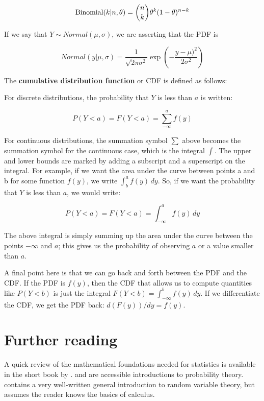 \documentclass[12pt,]{krantz}
\begin{document}
\begin{equation}
\hbox{Binomial}(k|n,\theta) = 
\binom{n}{k} \theta^{k} (1-\theta)^{n-k}
\end{equation}

If we say that \(Y\sim Normal(\mu,\sigma)\), we are asserting that the PDF is

\begin{equation}
Normal(y|\mu,\sigma)= \frac{1}{\sqrt{2\pi \sigma^2}} \exp \left(-\frac{y-\mu)^2}{2\sigma^2} \right)
\end{equation}

The \textbf{cumulative distribution function} or CDF is defined as follows:

For discrete distributions, the probability that \(Y\) is less than \(a\) is written:

\begin{equation}
P(Y<a) = F(Y<a) =\sum_{-\infty}^{a} f(y)
\end{equation}

For continuous distributions, the summation symbol \(\sum\) above becomes the summation symbol for the continuous case, which is the integral \(\int\). The upper and lower bounds are marked by adding a subscript and a superscript on the integral. For example, if we want the area under the curve between points a and b for some function \(f(y)\), we write \(\int_b^a f(y)\, dy\). So, if we want the probability that \(Y\) is less than \(a\), we would write:

\begin{equation}
P(Y<a) = F(Y<a) =\int_{-\infty}^{a} f(y)\, dy
\end{equation}

The above integral is simply summing up the area under the curve between the points \(-\infty\) and \(a\); this gives us the probability of observing \(a\) or a value smaller than \(a\).

A final point here is that we can go back and forth between the PDF and the CDF. If the PDF is \(f(y)\), then the CDF that allows us to compute quantities like \(P(Y<b)\) is just the integral \(F(Y<b)=\int_{-\infty}^b f(y)\, dy\). If we differentiate the CDF, we get the PDF back: \(d(F(y))/dy=f(y)\).

\hypertarget{further-reading}{%
\section{Further reading}\label{further-reading}}

A quick review of the mathematical foundations needed for statistics is available in the short book by \citet{fox2009mathematical}. \citet{morin2016probability} and \citet{blitzstein2014introduction} are accessible introductions to probability theory. \citet{kerns} contains a very well-written general introduction to random variable theory, but assumes the reader knows the basics of calculus.
\end{document}
